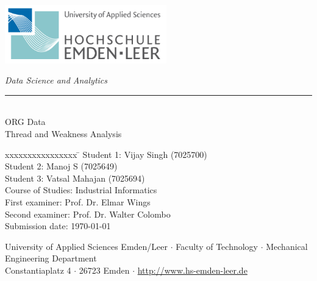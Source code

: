 %
%

\begin{titlepage}
    
    \begin{flushleft} 
        \includegraphics[width=7cm]{General/Logo.png}
    \end{flushleft} 
    
    \begin{flushright}
        \vspace{2cm}
        \LARGE \textsl{Data Science and Analytics}\\
        \rule{0.6\textwidth}{0.4pt} ~\\
        \vspace{0.5cm}
        \textsf{\LARGE ORG Data}\\
        \textsf{\LARGE Thread and Weakness Analysis}
    \end{flushright}
    
    \vspace{2cm}
    \large
    \begin{tabbing}
        xxxxxxxxxxxxxxxx \= \kill
        Student 1: \> Vijay Singh (7025700)\\
        Student 2: \> Manoj S (7025649) \\
        Student 3: \> Vatsal Mahajan (7025694)\\
        Course of Studies: \> Industrial Informatics \\ [0.5cm]
        First examiner: \> Prof. Dr. Elmar Wings \\
        Second examiner: \> Prof. Dr. Walter Colombo \\ [0.5cm]
        Submission date: \> \today \\
    \end{tabbing}
    
    \vspace{3cm}
    \small
    \begin{center}
        University of Applied Sciences Emden/Leer $\cdot$ 
        Faculty of Technology $\cdot$ 
        Mechanical Engineering Department \\
        Constantiaplatz 4 $\cdot$ 
        26723 Emden $\cdot$ 
        \url{http://www.hs-emden-leer.de}
    \end{center}
    
\end{titlepage}
